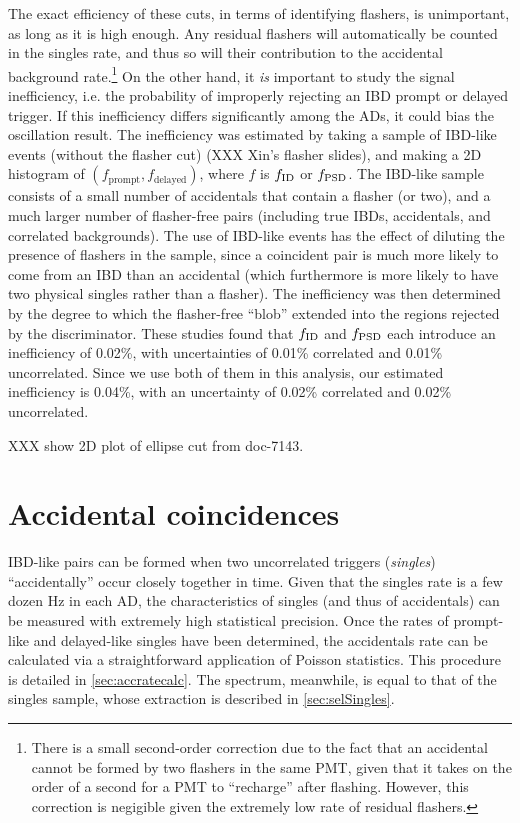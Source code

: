 \documentclass[../thesis.tex]{subfiles}
\begin{document}
The exact efficiency of these cuts, in terms of identifying flashers, is
unimportant, as long as it is high enough. Any residual flashers will
automatically be counted in the singles rate, and thus so will their
contribution to the accidental background rate.\footnote{There is a small
  second-order correction due to the fact that an accidental cannot be formed by
  two flashers in the same PMT, given that it takes on the order of a second for
  a PMT to ``recharge'' after flashing. However, this correction is negigible
  given the extremely low rate of residual flashers.} On the other hand, it
\emph{is} important to study the signal inefficiency, i.e. the probability of
improperly rejecting an IBD prompt or delayed trigger. If this inefficiency
differs significantly among the ADs, it could bias the oscillation result. The
inefficiency was estimated by taking a sample of IBD-like events (without the
flasher cut) (XXX Xin's flasher slides), and making a 2D histogram of
$(f_{\mathrm{prompt}},f_{\mathrm{delayed}})$, where $f$ is $f_{\mathrm{ID}}$ or
$f_{\mathrm{PSD}}$. The IBD-like sample consists of a small number of accidentals that
contain a flasher (or two), and a much larger number of flasher-free pairs
(including true IBDs, accidentals, and correlated backgrounds). The use of
IBD-like events has the effect of diluting the presence of flashers in the
sample, since a coincident pair is much more likely to come from an IBD than an
accidental (which furthermore is more likely to have two physical singles rather
than a flasher). The inefficiency was then determined by the degree to which the
flasher-free ``blob'' extended into the regions rejected by the
discriminator. These studies found that $f_{\mathrm{ID}}$ and $f_{\mathrm{PSD}}$ each introduce an
inefficiency of 0.02\%, with uncertainties of 0.01\% correlated and 0.01\%
uncorrelated. Since we use both of them in this analysis, our estimated
inefficiency is 0.04\%, with an uncertainty of 0.02\% correlated and 0.02\%
uncorrelated.

XXX show 2D plot of ellipse cut from doc-7143.

\section{Accidental coincidences}
\label{sec:accbkg}

IBD-like pairs can be formed when two uncorrelated triggers (\emph{singles})
``accidentally'' occur closely together in time. Given that the singles rate is
a few dozen Hz in each AD, the characteristics of singles (and thus of
accidentals) can be measured with extremely high statistical precision. Once the
rates of prompt-like and delayed-like singles have been determined, the
accidentals rate can be calculated via a straightforward application of Poisson
statistics. This procedure is detailed in \autoref{sec:accratecalc}. The
spectrum, meanwhile, is equal to that of the singles sample, whose extraction is
described in \autoref{sec:selSingles}.
\end{document}
